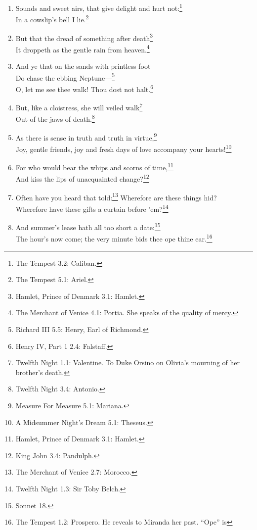 \documentclass[17pt,twoside]{extarticle}
\begin{document}
\begin{enumerate}
  And some donation freely to estate\footnote{The Tempest 4.1: Iris.}\\Under
  the blossom that hangs on the bough.\footnote{The Tempest 5.1: Ariel.}
\item
  Sounds and sweet airs, that give delight and hurt not:\footnote{The
    Tempest 3.2: Caliban.}\\In a cowslip's bell I lie.\footnote{The
    Tempest 5.1: Ariel.}
\item
  But that the dread of something after death\footnote{Hamlet, Prince of
    Denmark 3.1: Hamlet.}\\It droppeth as the gentle rain from
  heaven.\footnote{The Merchant of Venice 4.1: Portia. She speaks of the
    quality of mercy.}
\item
  And ye that on the sands with printless foot\\Do chase the ebbing
  Neptune---\footnote{Richard III 5.5: Henry, Earl of Richmond.}\\O, let
  me see thee walk! Thou dost not halt.\footnote{Henry IV, Part 1 2.4:
    Falstaff.}
\item
  But, like a cloistress, she will veiled walk\footnote{Twelfth Night
    1.1: Valentine. To Duke Orsino on Olivia's mourning of her brother's
    death.}\\Out of the jaws of death.\footnote{Twelfth Night 3.4:
    Antonio.}
\item
  As there is sense in truth and truth in virtue,\footnote{Measure For
    Measure 5.1: Mariana.}\\Joy, gentle friends, joy and fresh days of
  love accompany your hearts!\footnote{A Midsummer Night's Dream 5.1:
    Theseus.}
\item
  For who would bear the whips and scorns of time,\footnote{Hamlet,
    Prince of Denmark 3.1: Hamlet.}\\And kiss the lips of unacquainted
  change?\footnote{King John 3.4: Pandulph.}
\item
  Often have you heard that told:\footnote{The Merchant of Venice 2.7:
    Morocco.} Wherefore are these things hid?\\Wherefore have these
  gifts a curtain before 'em?\footnote{Twelfth Night 1.3: Sir Toby
    Belch.}
\item
  And summer's lease hath all too short a date:\footnote{Sonnet 18.}\\The
  hour's now come; the very minute bids thee ope thine ear.\footnote{The
    Tempest 1.2: Prospero. He reveals to Miranda her past. ``Ope'' is
}
\end{enumerate}
\end{document}
